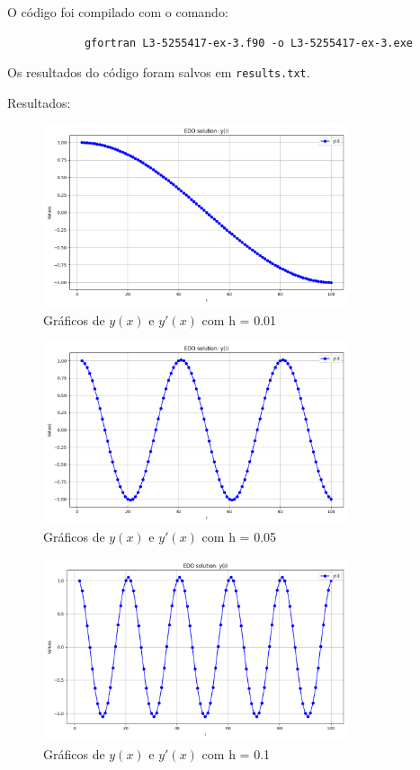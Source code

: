 \documentclass[12pt, a4paper]{article} %
\begin{document}
        O c\'odigo foi compilado com o comando:
        \begin{verbatim}
            gfortran L3-5255417-ex-3.f90 -o L3-5255417-ex-3.exe
        \end{verbatim}

        Os resultados do c\'odigo foram salvos em \texttt{results.txt}.

        Resultados:
        \begin{figure}[H]
            \centering
            \includegraphics[width=0.8\textwidth]{../images/results-ex-3-2.png}
            \caption{Gr\'aficos de $y(x)$ e $y'(x)$ com h = 0.01}
        \end{figure}
        \begin{figure}[H]
            \centering
            \includegraphics[width=0.8\textwidth]{../images/results-ex-3-4.png}
            \caption{Gr\'aficos de $y(x)$ e $y'(x)$ com h = 0.05}
        \end{figure}
        \begin{figure}[H]
            \centering
            \includegraphics[width=0.8\textwidth]{../images/results-ex-3-1.png}
            \caption{Gr\'aficos de $y(x)$ e $y'(x)$ com h = 0.1}
        \end{figure}
\end{document}
